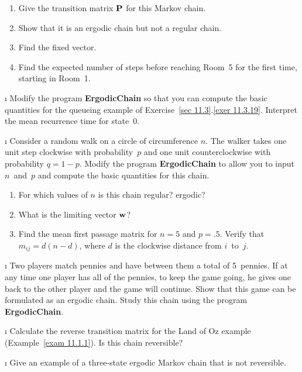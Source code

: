 \begin{LJSItem}
\begin{enumerate}
\item Give the transition matrix ${\mbox{\bf P}\/}$ for this Markov chain.

\item Show that it is an ergodic chain but not a regular chain.

\item Find the fixed vector.

\item Find the expected number of steps before reaching Room~5 for the first
time, starting in Room~1.
\end{enumerate}

\i\label{exer 11.5.8} Modify the program {\bf  ErgodicChain} so that you 
can compute the basic quantities for the queueing example of Exercise~\ref{sec
11.3}.\ref{exer
11.3.19}.  Interpret the mean recurrence time for state~0.

\i\label{exer 11.5.9} Consider a random walk on a circle of circumference $n$. 
The walker
takes one unit step clockwise with  probability~$p$ and one unit
counterclockwise with
probability $q = 1 - p$.   Modify the program {\bf  ErgodicChain} to allow you
to input
$n$~and~$p$ and compute the basic quantities for this chain.
\begin{enumerate}

\item For which values of $n$ is this chain regular?  ergodic?

\item What is the limiting vector ${\mbox{\bf w}\/}$?

\item Find the mean first passage matrix for $n = 5$ and $p = .5$.  Verify
that $m_{ij} = d(n - d)$, where $d$ is the clockwise distance from $i$~to~$j$.
\end{enumerate}
 
\i\label{exer 11.5.10} Two players match pennies and have between them a total 
of 5~pennies.  If at any time one player has all of the pennies, to keep the
game
going, he gives one back to the other player and the game will continue.  Show
that
this game can be formulated as an ergodic chain.  Study this chain using the
program
{\bf  ErgodicChain}.

\i\label{exer 11.5.11} Calculate the reverse transition matrix for the Land of 
Oz example (Example~\ref{exam 11.1.1}).  Is this chain reversible?

\i\label{exer 11.5.12} Give an example of a three-state ergodic Markov chain
that is not reversible.


\end{LJSItem}
